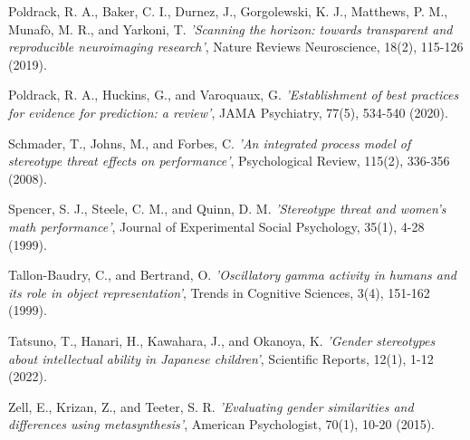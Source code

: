 \documentclass[12pt, a4paper]{article}
\begin{document}
\begin{thebibliography}{99}
Poldrack, R. A., Baker, C. I., Durnez, J., Gorgolewski, K. J., Matthews, P. M., Munafò, M. R., and Yarkoni, T.
{\it 'Scanning the horizon: towards transparent and reproducible neuroimaging research'},
Nature Reviews Neuroscience, 18(2), 115-126 (2019).

Poldrack, R. A., Huckins, G., and Varoquaux, G.
{\it 'Establishment of best practices for evidence for prediction: a review'},
JAMA Psychiatry, 77(5), 534-540 (2020).

Schmader, T., Johns, M., and Forbes, C.
{\it 'An integrated process model of stereotype threat effects on performance'},
Psychological Review, 115(2), 336-356 (2008).

Spencer, S. J., Steele, C. M., and Quinn, D. M.
{\it 'Stereotype threat and women's math performance'},
Journal of Experimental Social Psychology, 35(1), 4-28 (1999).

Tallon-Baudry, C., and Bertrand, O.
{\it 'Oscillatory gamma activity in humans and its role in object representation'},
Trends in Cognitive Sciences, 3(4), 151-162 (1999).

Tatsuno, T., Hanari, H., Kawahara, J., and Okanoya, K.
{\it 'Gender stereotypes about intellectual ability in Japanese children'},
Scientific Reports, 12(1), 1-12 (2022).

Zell, E., Krizan, Z., and Teeter, S. R.
{\it 'Evaluating gender similarities and differences using metasynthesis'},
American Psychologist, 70(1), 10-20 (2015).






\end{thebibliography}
\end{document}

